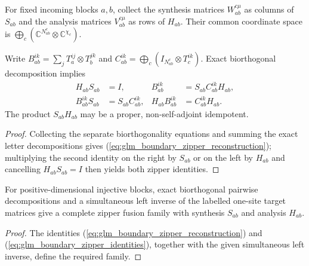 \begin{definition}
    \leanok
    \label{def:glm_boundary_zipper_coordinates}
    For fixed incoming blocks $a,b$, collect the synthesis matrices
    $W_{ab}^{c\mu}$ as columns of $S_{ab}$ and the analysis matrices
    $V_{ab}^{c\mu}$ as rows of $H_{ab}$. Their common coordinate space is
    $\bigoplus_c(\mathbb C^{N_{ab}^c}\otimes\mathbb C^{\chi_c})$.
\end{definition}

\begin{lemma}
    \leanok
    \label{thm:glm_boundary_zipper_identities}
    Write $B_{ab}^{ik}=\sum_j T_a^{ij}\otimes T_b^{jk}$ and
    $C_{ab}^{ik}=\bigoplus_c(I_{N_{ab}^c}\otimes T_c^{ik})$.
    Exact biorthogonal decomposition implies
    \begin{align}
        H_{ab}S_{ab}      & =I,                 & B_{ab}^{ik} & =S_{ab}C_{ab}^{ik}H_{ab},
        \label{eq:glm_boundary_zipper_reconstruction}                                     \\
        B_{ab}^{ik}S_{ab} & =S_{ab}C_{ab}^{ik}, &
        H_{ab}B_{ab}^{ik} & =C_{ab}^{ik}H_{ab}.
        \label{eq:glm_boundary_zipper_identities}
    \end{align}
    The product $S_{ab}H_{ab}$ may be a proper, non-self-adjoint idempotent.
\end{lemma}
\begin{proof}
    \leanok
    Collecting the separate biorthogonality equations and summing the exact
    letter decompositions gives (\ref{eq:glm_boundary_zipper_reconstruction});
    multiplying the second identity on the right by $S_{ab}$ or on the left by
    $H_{ab}$ and cancelling $H_{ab}S_{ab}=I$ then yields both zipper
    identities.
\end{proof}

\begin{definition}
    \leanok
    \label{def:glm_boundary_zipper_family}
    For positive-dimensional injective blocks, exact biorthogonal pairwise
    decompositions and a simultaneous left inverse of the labelled
    one-site target matrices give a complete zipper fusion family with
    synthesis $S_{ab}$ and analysis $H_{ab}$.
\end{definition}
\begin{proof}
    \leanok
    The identities (\ref{eq:glm_boundary_zipper_reconstruction}) and
    (\ref{eq:glm_boundary_zipper_identities}), together with the given
    simultaneous left inverse, define the required family.
\end{proof}

